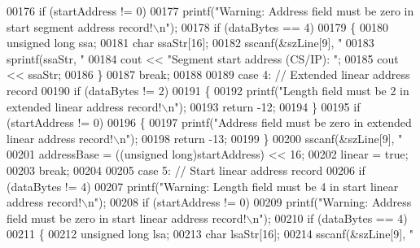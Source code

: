 \begin{DoxyCode}
{{{{{00176             \textcolor{keywordflow}{if} (startAddress != 0)
00177                 printf(\textcolor{stringliteral}{"Warning: Address field must be zero in start segment address record!\(\backslash\)n"});
00178             \textcolor{keywordflow}{if} (dataBytes == 4)
00179             \{
00180                 \textcolor{keywordtype}{unsigned} \textcolor{keywordtype}{long} ssa;
00181                 \textcolor{keywordtype}{char}    ssaStr[16];
00182                 sscanf(&szLine[9], \textcolor{stringliteral}{"%
00183                 sprintf(ssaStr, \textcolor{stringliteral}{"%
00184                 cout << \textcolor{stringliteral}{"Segment start address (CS/IP): "};
00185                 cout << ssaStr;
00186             \}
00187             \textcolor{keywordflow}{break};
00188 
00189         \textcolor{keywordflow}{case} 4: \textcolor{comment}{// Extended linear address record}
00190             \textcolor{keywordflow}{if} (dataBytes != 2)
00191             \{
00192                 printf(\textcolor{stringliteral}{"Length field must be 2 in extended linear address record!\(\backslash\)n"});
00193                 \textcolor{keywordflow}{return} -12;
00194             \}
00195             \textcolor{keywordflow}{if} (startAddress != 0)
00196             \{
00197                 printf(\textcolor{stringliteral}{"Address field must be zero in extended linear address record!\(\backslash\)n"});
00198                 \textcolor{keywordflow}{return} -13;
00199             \}
00200             sscanf(&szLine[9], \textcolor{stringliteral}{"%
00201             addressBase = ((\textcolor{keywordtype}{unsigned} long)startAddress) << 16;
00202             linear = \textcolor{keyword}{true};
00203             \textcolor{keywordflow}{break};
00204 
00205         \textcolor{keywordflow}{case} 5: \textcolor{comment}{// Start linear address record}
00206             \textcolor{keywordflow}{if} (dataBytes != 4)
00207                 printf(\textcolor{stringliteral}{"Warning: Length field must be 4 in start linear address record!\(\backslash\)n"});
00208             \textcolor{keywordflow}{if} (startAddress != 0)
00209                 printf(\textcolor{stringliteral}{"Warning: Address field must be zero in start linear address record!\(\backslash\)n"});
00210             \textcolor{keywordflow}{if} (dataBytes == 4)
00211             \{
00212                 \textcolor{keywordtype}{unsigned} \textcolor{keywordtype}{long} lsa;
00213                 \textcolor{keywordtype}{char}    lsaStr[16];
00214                 sscanf(&szLine[9], \textcolor{stringliteral}{"%
}}}}}}}}}
\end{DoxyCode}
